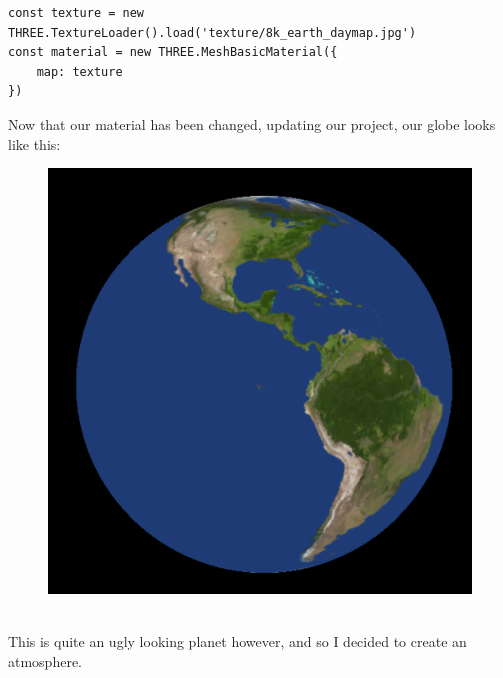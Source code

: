 \begin{lstlisting}
const texture = new THREE.TextureLoader().load('texture/8k_earth_daymap.jpg')
const material = new THREE.MeshBasicMaterial({
    map: texture
})
\end{lstlisting}

Now that our material has been changed, updating our project, our globe looks like this: \\
\begin{figure}[ht]
\centering
\includegraphics[width=0.5\linewidth]{images/mapping}
\caption{}
\label{fig:mapping}
\end{figure}
\\ This is quite an ugly looking planet however, and so I decided to create an atmosphere.
\newpage
